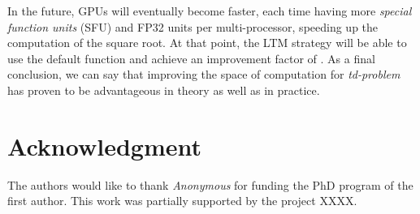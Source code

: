 \documentclass[conference]{IEEEtran}
\begin{document}
In the future, GPUs will eventually become faster, each time having more 
\textit{special function units} (SFU) and FP32 units per multi-processor, speeding up the computation of the square root. 
At that point, the LTM strategy will be able to use the default  function and achieve an improvement factor of . 
As a final conclusion, we can say that improving the space of computation for \textit{td-problem} has proven to be advantageous in theory as well as in practice.


\section*{Acknowledgment}
The authors would like to thank \textit{Anonymous} for funding the PhD program of the first author. 
This work was partially supported by the project XXXX. 











\end{document}
